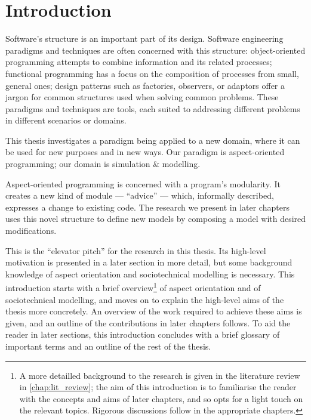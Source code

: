 \chapter{Introduction}


Software's structure is an important part of its design. Software engineering
paradigms and techniques are often concerned with this structure:
object-oriented programming attempts to combine information and its related
processes; functional programming has a focus on the composition of processes
from small, general ones; design patterns such as factories, observers, or
adaptors offer a jargon for common structures used when solving common problems.
These paradigms and techniques are tools, each suited to addressing different
problems in different scenarios or domains.

This thesis investigates a paradigm
being applied to a new domain, where it can be used for new purposes and in new
ways. Our paradigm is aspect-oriented programming; our domain is \sociotechnical
simulation \& modelling. 

Aspect-oriented programming is concerned with a program's modularity. It creates
a new kind of module --- ``advice'' --- which, informally described, expresses
a change to existing code. The research we present in later chapters uses this
novel structure to define new models by composing a model with desired modifications.

This is the ``elevator pitch'' for the research in this thesis. Its high-level
motivation is presented in a later section in more detail, but some background
knowledge of aspect orientation and sociotechnical modelling is necessary. This
introduction starts with a brief overview\footnote{A more detailled background
  to the research is given in the literature review in \cref{chap:lit_review};
  the aim of this introduction is to familiarise the reader with the concepts
  and aims of later chapters, and so opts for a light touch on the relevant
topics. Rigorous discussions follow in the appropriate chapters.} of aspect
orientation and of sociotechnical modelling, and moves on to explain the
high-level aims of the thesis more concretely. An overview of the work required
to achieve these aims is given, and an outline of the contributions in later
chapters follows. To aid the reader in later sections, this introduction
concludes with a brief glossary of important terms and an outline of the rest of
the thesis.




